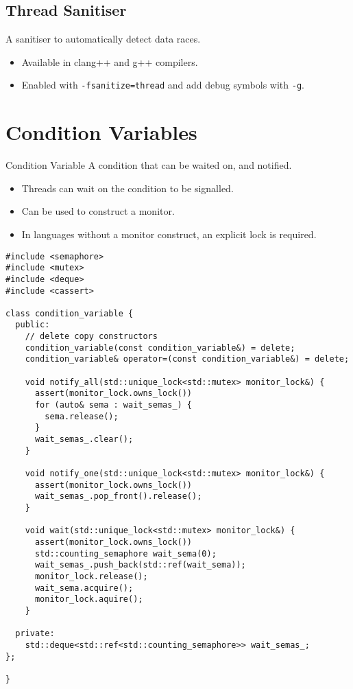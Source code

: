 \subsection{Thread Sanitiser}
A sanitiser to automatically detect data races.
\begin{itemize}
  \item Available in clang++ and g++ compilers.
  \item Enabled with \texttt{-fsanitize=thread} and add debug symbols with \texttt{-g}.
\end{itemize}

\section{Condition Variables}
\begin{definitionbox}{Condition Variable}
  A condition that can be waited on, and notified.
  \begin{itemize}
    \item Threads can wait on the condition to be signalled.
    \item Can be used to construct a monitor.
    \item In languages without a monitor construct, an explicit lock is required.
  \end{itemize}
  \begin{verbatim}
#include <semaphore>
#include <mutex>
#include <deque>
#include <cassert> 

class condition_variable {
  public:
    // delete copy constructors
    condition_variable(const condition_variable&) = delete;
    condition_variable& operator=(const condition_variable&) = delete;

    void notify_all(std::unique_lock<std::mutex> monitor_lock&) {
      assert(monitor_lock.owns_lock())
      for (auto& sema : wait_semas_) {
        sema.release();
      }
      wait_semas_.clear();
    }

    void notify_one(std::unique_lock<std::mutex> monitor_lock&) {
      assert(monitor_lock.owns_lock())
      wait_semas_.pop_front().release();
    }

    void wait(std::unique_lock<std::mutex> monitor_lock&) {
      assert(monitor_lock.owns_lock())
      std::counting_semaphore wait_sema(0);
      wait_semas_.push_back(std::ref(wait_sema));
      monitor_lock.release();
      wait_sema.acquire();
      monitor_lock.aquire();
    }
  
  private:
    std::deque<std::ref<std::counting_semaphore>> wait_semas_;
};

}
  \end{verbatim}
\end{definitionbox}

